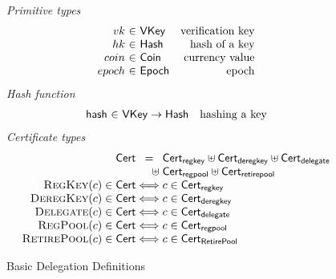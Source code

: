 \documentclass[11pt,a4paper]{article}
\newcommand{\uniondistinct}{\uplus}
\newcommand{\fun}[1]{\mathsf{#1}}
\newcommand{\type}[1]{\mathsf{#1}}
\begin{document}
\begin{figure}

\emph{Primitive types}
%
\begin{equation*}
\begin{array}{r@{~\in~}lr}
  vk & \type{VKey} & \text{verification key}
\\
  hk & \type{Hash} & \text{hash of a key}
\\
  coin & \type{Coin} & \text{currency value}
\\
epoch & \type{Epoch} & \text{epoch}
\end{array}
\end{equation*}
%
\emph{Hash function}
%
\begin{equation*}
\begin{array}{r@{~\in~}lr}
  \fun{hash} & \type{VKey} \to \type{Hash}
& \text{hashing a key}
\end{array}
\end{equation*}
%
\emph{Certificate types}
%
\begin{equation*}
\begin{array}{r@{}c@{}l}
  \type{Cert} &=& \type{Cert_{regkey}} \uniondistinct
                \type{Cert_{deregkey}} \uniondistinct
                \type{Cert_{delegate}} \\
              &\hfill\uniondistinct\;&
                \type{Cert_{regpool}} \uniondistinct
                \type{Cert_{retirepool}} \\
  \textsc{RegKey}(c) \in \type{Cert} &\iff& c \in \type{Cert_{regkey}} \\
  \textsc{DeregKey}(c) \in \type{Cert} &\iff& c \in \type{Cert_{deregkey}} \\
  \textsc{Delegate}(c) \in \type{Cert} &\iff& c \in \type{Cert_{delegate}} \\
  \textsc{RegPool}(c) \in \type{Cert} &\iff& c \in \type{Cert_{regpool}} \\
  \textsc{RetirePool}(c) \in \type{Cert} &\iff& c \in \type{Cert_{RetirePool}} \\
\end{array}
\end{equation*}

\caption{Basic Delegation Definitions}
\label{fig:basic_delegation}
\end{figure}
\end{document}
